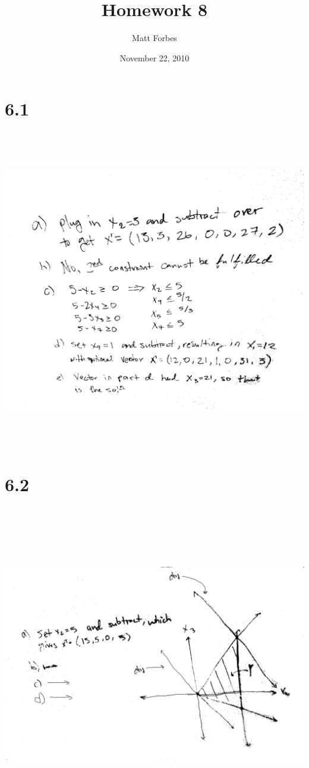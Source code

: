 \documentclass[a4paper,12pt]{article}
\begin{document}
\title{Homework 8}
\author{Matt Forbes}
\date{November 22, 2010}
\maketitle
\section*{6.1}
\includegraphics[width=14cm, height=14cm, keepaspectratio=true]{image/sixone.jpg}
\section*{6.2}
\includegraphics[width=14cm, height=14cm, keepaspectratio=true]{image/sixtwo.jpg}
\end{document}
